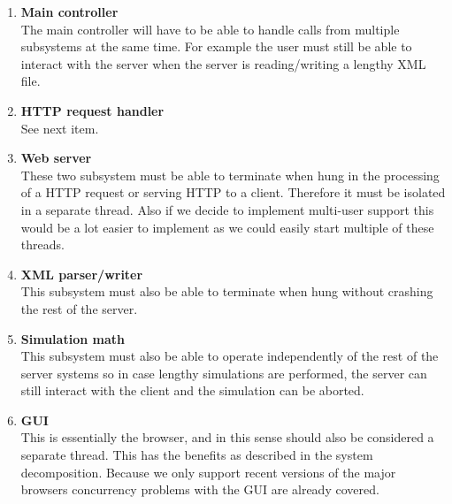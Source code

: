 \documentclass{article}
\begin{document}
\begin{enumerate}
\item \textbf{Main controller} \\
The main controller will have to be able to handle calls from multiple subsystems at the same time. For example the user must still be able to interact with the server when the server is reading/writing a lengthy XML file.\item \textbf{HTTP request handler} \\
See next item.
\item \textbf{Web server} \\
These two subsystem must be able to terminate when hung in the processing of a HTTP request or serving HTTP to a client. Therefore it must be isolated in a separate thread. Also if we decide to implement multi-user support this would be a lot easier to implement as we could easily start multiple of these threads. 
\item \textbf{XML parser/writer} \\
This subsystem must also be able to terminate when hung without crashing the rest of the server.
\item \textbf{Simulation math} \\
This subsystem must also be able to operate independently of the rest of the server systems so in case lengthy simulations are performed, the server can still interact with the client and the simulation can be aborted.
\item \textbf{GUI} \\
This is essentially the browser, and in this sense should also be considered a separate thread. This has the benefits as described in the system decomposition. Because we only support recent versions of the major browsers concurrency problems with the GUI are already covered.\end{enumerate}
\end{document}
